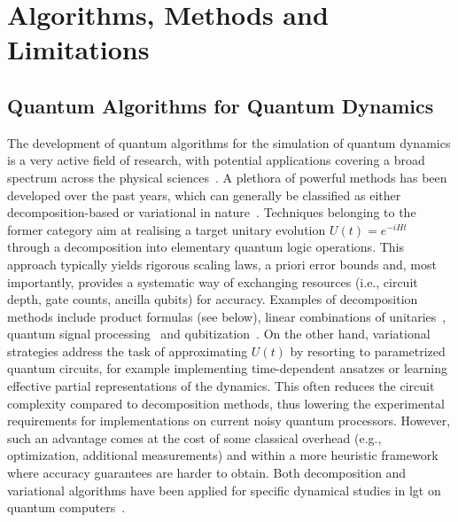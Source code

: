 \section{Algorithms, Methods and Limitations\label{sec:algs}}


\subsection{Quantum Algorithms for Quantum Dynamics}
\label{subsubsec_algo_dyn}

The development of quantum algorithms for the simulation of quantum dynamics is a very active field of research, with potential applications covering a broad spectrum across the physical sciences~\cite{Tacchino2020,Miessen2023}.
A plethora of powerful methods has been developed over the past years, which can generally be classified as either decomposition-based or variational in nature~\cite{Miessen2023}. Techniques belonging to the former category aim at realising a target unitary evolution $U(t)=e^{-iHt}$ through a decomposition into elementary quantum logic operations. This approach typically yields rigorous scaling laws, a priori error bounds and, most importantly, provides a systematic way of exchanging resources (i.e., circuit depth, gate counts, ancilla qubits) for accuracy. Examples of decomposition methods include product formulas (see below), linear combinations of unitaries~\cite{berry2015simulating}, quantum signal processing~\cite{low2017} and qubitization~\cite{Low2019hamiltonian}. On the other hand, variational strategies address the task of approximating $U(t)$ by resorting to parametrized quantum circuits, for example implementing time-dependent ansatzes or learning effective partial representations of the dynamics. This often reduces the circuit complexity compared to decomposition methods, thus lowering the experimental requirements for implementations on current noisy quantum processors. However, such an advantage comes at the cost of some classical overhead (e.g., optimization, additional measurements) and within a more heuristic framework where accuracy guarantees are harder to obtain. Both decomposition and variational algorithms have been applied for specific dynamical studies in \gls{lgt} on quantum computers~\cite{Mathis2020,nagano2023}.

